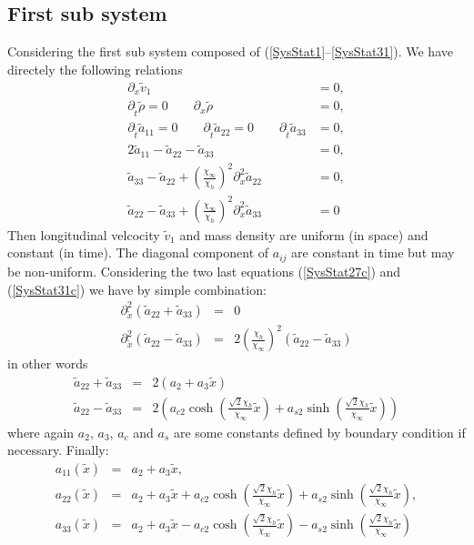 \documentclass[
10pt, %
a4paper, %
oneside, %
headinclude,footinclude, %
table
]{scrartcl}
\begin{document}
\subsection{First sub system}
Considering the first sub system composed of (\ref{SysStat1}--\ref{SysStat31}). We have directely the following relations
\begin{subequations}\label{SysStatTT}
\begin{align}
\label{SysStat5}	\partial_{x}{\tilde{v}_1}&=0,\\   
\label{SysStat1}	\partial_{\tilde{t}}\tilde{\rho}=0\quad\quad \partial_{x}{\tilde{\rho }}&=0,\\   
\label{SysStat2}	\partial_{\tilde{t}}\tilde{a}_{11}=0\quad\quad\partial_{\tilde{t}}\tilde{a}_{22}=0\quad\quad\partial_{\tilde{t}}\tilde{a}_{33}&=0,\\   
\label{SysStat23}	2\tilde{a}_{11}-\tilde{a}_{22}-\tilde{a}_{33}&=0,\\   
\label{SysStat27c}	\tilde{a}_{33}-\tilde{a}_{22}+(\frac{\chi _{\infty }}{\chi_{h}})^2\partial_{x}^2\tilde{a}_{22}&=0,\\   
\label{SysStat31c}	\tilde{a}_{22}-\tilde{a}_{33}+(\frac{\chi _{\infty }}{\chi_{h}})^2\partial_{x}^2\tilde{a}_{33}&=0
 \end{align} 
 \end{subequations}
Then longitudinal velcocity $\tilde{v}_{1}$ and mass density are uniform (in space) and constant (in time). The diagonal component of $a_{ij}$ are constant in time but may be non-uniform. Considering the two last equations (\ref{SysStat27c}) and (\ref{SysStat31c}) we have by simple combination:
$$
\begin{array}{rcl}
\partial_{\tilde{x}}^2(\tilde{a}_{22}+\tilde{a}_{33})&=&0\\
 \partial_{\tilde{x}}^2(\tilde{a}_{22}-\tilde{a}_{33}) &=&2(\frac{\chi _h}{\chi _{\infty }})^2 \left(\tilde{a}_{22}-\tilde{a}_{33}\right) 
\end{array}
 $$
in other words
$$
\begin{array}{rcl}
\tilde{a}_{22}+\tilde{a}_{33}&=&2(a_{2}+a_{3} \tilde{x})\\
\tilde{a}_{22}-\tilde{a}_{33}&=&2\left(a_{c2} \cosh \left(\frac{\sqrt{2}  \chi _h}{\chi
   _{\infty }}\tilde{x}\right)+a_{s2} \sinh \left(\frac{\sqrt{2} \chi _h}{\chi _{\infty
   }}\tilde{x} \right)\right)
\end{array}
$$
where again $a_{2}$, $a_{3}$, $a_{c}$ and $a_{s}$ are some constants defined by boundary condition if necessary. Finally:
$$
\begin{array}{rcl}
a_{11}(\tilde{x}) &=&a_{2}+a_{3} \tilde{x},
\\
a_{22}(\tilde{x}) &=&a_{2}+a_{3} \tilde{x}+a_{c2} \cosh (\frac{\sqrt{2}  \chi _h}{\chi
   _{\infty }}\tilde{x})+a_{s2} \sinh (\frac{\sqrt{2} \chi _h}{\chi _{\infty
   }}\tilde{x} ),
\\
a_{33}(\tilde{x}) &=&a_{2}+a_{3} \tilde{x}-a_{c2} \cosh (\frac{\sqrt{2}\chi _h}{\chi
   _{\infty }} \tilde{x} )-a_{s2} \sinh (\frac{\sqrt{2} \chi _h}{\chi _{\infty
   }}\tilde{x} )
\end{array} 
$$
\end{document}
